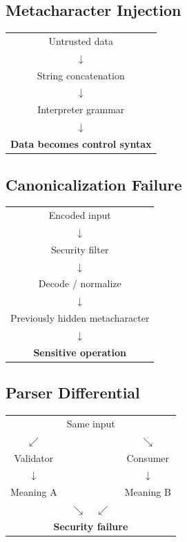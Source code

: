 \documentclass[11pt]{article}
\begin{document}
\subsection{Metacharacter Injection}

\begin{vulnpattern}
\begin{center}
\begin{tabular}{c}
Untrusted data \\
\(\downarrow\) \\
String concatenation \\
\(\downarrow\) \\
Interpreter grammar \\
\(\downarrow\) \\
\textbf{Data becomes control syntax}
\end{tabular}
\end{center}
\end{vulnpattern}

\subsection{Canonicalization Failure}

\begin{vulnpattern}
\begin{center}
\begin{tabular}{c}
Encoded input \\
\(\downarrow\) \\
Security filter \\
\(\downarrow\) \\
Decode / normalize \\
\(\downarrow\) \\
Previously hidden metacharacter \\
\(\downarrow\) \\
\textbf{Sensitive operation}
\end{tabular}
\end{center}
\end{vulnpattern}

\subsection{Parser Differential}

\begin{vulnpattern}
\begin{center}
\begin{tabular}{ccc}
& Same input & \\
\(\swarrow\) & & \(\searrow\) \\
Validator & & Consumer \\
\(\downarrow\) & & \(\downarrow\) \\
Meaning A & & Meaning B \\
\multicolumn{3}{c}{\(\searrow\quad\swarrow\)} \\
\multicolumn{3}{c}{\textbf{Security failure}}
\end{tabular}
\end{center}
\end{vulnpattern}
\end{document}

